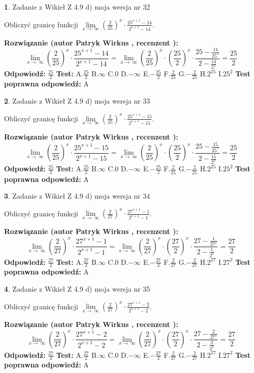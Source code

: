 \documentclass[12pt, a4paper]{article}
\theoremstyle{definition} %
\newtheorem{zad}{}
\newcommand{\zadStart}[1]{\begin{zad}#1\newline}
\newcommand{\zadStop}{\end{zad}}
\newcommand{\rozwStart}[2]{\noindent \textbf{Rozwiązanie (autor #1 , recenzent #2): }\newline}
\newcommand{\rozwStop}{\newline}
\newcommand{\odpStart}{\noindent \textbf{Odpowiedź:}\newline}
\newcommand{\odpStop}{\newline}
\newcommand{\testStart}{\noindent \textbf{Test:}\newline}
\newcommand{\testStop}{\newline}
\newcommand{\kluczStart}{\noindent \textbf{Test poprawna odpowiedź:}\newline}
\newcommand{\kluczStop}{\newline}
\begin{document}
\zadStart{Zadanie z Wikieł Z 4.9 d) moja wersja nr 32}


Obliczyć granicę funkcji  $\lim\limits_{x\to\ \infty}(\frac{2}{25})^{x}\cdot\frac{25^{x+1}-14}{2^{x+1}-14}$.
\zadStop
\rozwStart{Patryk Wirkus}{}
$$\lim\limits_{x\to\ \infty}(\frac{2}{25})^{x}\cdot\frac{25^{x+1}-14}{2^{x+1}-14}=\lim\limits_{x\to\ \infty}(\frac{2}{25})^{x}\cdot(\frac{25}{2})^{x} \cdot \frac{25-\frac{14}{25^{x}}}{2-\frac{14}{2^{x}}} = \frac{25}{2}$$
\rozwStop
\odpStart
$\frac{25}{2}$
\odpStop
\testStart
A.$\frac{25}{2}$ B.$\infty$ C.$0$ D.$-\infty$ E.$-\frac{25}{2}$
F.$\frac{2}{25}$ G.$-\frac{2}{25}$
H.$2^{25}$
I.$25^{2}$
\testStop
\kluczStart
A
\kluczStop



\zadStart{Zadanie z Wikieł Z 4.9 d) moja wersja nr 33}


Obliczyć granicę funkcji  $\lim\limits_{x\to\ \infty}(\frac{2}{25})^{x}\cdot\frac{25^{x+1}-15}{2^{x+1}-15}$.
\zadStop
\rozwStart{Patryk Wirkus}{}
$$\lim\limits_{x\to\ \infty}(\frac{2}{25})^{x}\cdot\frac{25^{x+1}-15}{2^{x+1}-15}=\lim\limits_{x\to\ \infty}(\frac{2}{25})^{x}\cdot(\frac{25}{2})^{x} \cdot \frac{25-\frac{15}{25^{x}}}{2-\frac{15}{2^{x}}} = \frac{25}{2}$$
\rozwStop
\odpStart
$\frac{25}{2}$
\odpStop
\testStart
A.$\frac{25}{2}$ B.$\infty$ C.$0$ D.$-\infty$ E.$-\frac{25}{2}$
F.$\frac{2}{25}$ G.$-\frac{2}{25}$
H.$2^{25}$
I.$25^{2}$
\testStop
\kluczStart
A
\kluczStop



\zadStart{Zadanie z Wikieł Z 4.9 d) moja wersja nr 34}


Obliczyć granicę funkcji  $\lim\limits_{x\to\ \infty}(\frac{2}{27})^{x}\cdot\frac{27^{x+1}-1}{2^{x+1}-1}$.
\zadStop
\rozwStart{Patryk Wirkus}{}
$$\lim\limits_{x\to\ \infty}(\frac{2}{27})^{x}\cdot\frac{27^{x+1}-1}{2^{x+1}-1}=\lim\limits_{x\to\ \infty}(\frac{2}{27})^{x}\cdot(\frac{27}{2})^{x} \cdot \frac{27-\frac{1}{27^{x}}}{2-\frac{1}{2^{x}}} = \frac{27}{2}$$
\rozwStop
\odpStart
$\frac{27}{2}$
\odpStop
\testStart
A.$\frac{27}{2}$ B.$\infty$ C.$0$ D.$-\infty$ E.$-\frac{27}{2}$
F.$\frac{2}{27}$ G.$-\frac{2}{27}$
H.$2^{27}$
I.$27^{2}$
\testStop
\kluczStart
A
\kluczStop



\zadStart{Zadanie z Wikieł Z 4.9 d) moja wersja nr 35}


Obliczyć granicę funkcji  $\lim\limits_{x\to\ \infty}(\frac{2}{27})^{x}\cdot\frac{27^{x+1}-2}{2^{x+1}-2}$.
\zadStop
\rozwStart{Patryk Wirkus}{}
$$\lim\limits_{x\to\ \infty}(\frac{2}{27})^{x}\cdot\frac{27^{x+1}-2}{2^{x+1}-2}=\lim\limits_{x\to\ \infty}(\frac{2}{27})^{x}\cdot(\frac{27}{2})^{x} \cdot \frac{27-\frac{2}{27^{x}}}{2-\frac{2}{2^{x}}} = \frac{27}{2}$$
\rozwStop
\odpStart
$\frac{27}{2}$
\odpStop
\testStart
A.$\frac{27}{2}$ B.$\infty$ C.$0$ D.$-\infty$ E.$-\frac{27}{2}$
F.$\frac{2}{27}$ G.$-\frac{2}{27}$
H.$2^{27}$
I.$27^{2}$
\testStop
\kluczStart
A
\kluczStop
\end{document}

